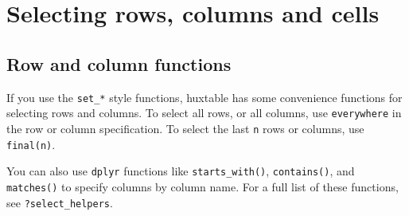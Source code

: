\documentclass[]{article}
\newenvironment{Shaded}{\begin{snugshade}}{\end{snugshade}}
\newcommand{\KeywordTok}[1]{\textcolor[rgb]{0.13,0.29,0.53}{\textbf{#1}}}
\newcommand{\NormalTok}[1]{#1}
\newcommand{\OperatorTok}[1]{\textcolor[rgb]{0.81,0.36,0.00}{\textbf{#1}}}
\newcommand{\StringTok}[1]{\textcolor[rgb]{0.31,0.60,0.02}{#1}}
\begin{document}
\hypertarget{selecting-rows-columns-and-cells}{%
\section{Selecting rows, columns and
cells}\label{selecting-rows-columns-and-cells}}

\hypertarget{row-and-column-functions}{%
\subsection{Row and column functions}\label{row-and-column-functions}}

If you use the \texttt{set\_*} style functions, huxtable has some
convenience functions for selecting rows and columns. To select all
rows, or all columns, use \texttt{everywhere} in the row or column
specification. To select the last \texttt{n} rows or columns, use
\texttt{final(n)}.

You can also use \texttt{dplyr} functions like \texttt{starts\_with()},
\texttt{contains()}, and \texttt{matches()} to specify columns by column
name. For a full list of these functions, see \texttt{?select\_helpers}.

\begin{Shaded}
\end{Shaded}

 
  \providecommand{\huxb}[2]{\arrayrulecolor[RGB]{#1}\global\arrayrulewidth=#2pt}
  \providecommand{\huxvb}[2]{\color[RGB]{#1}\vrule width #2pt}
  \providecommand{\huxtpad}[1]{\rule{0pt}{\baselineskip+#1}}
  \providecommand{\huxbpad}[1]{\rule[-#1]{0pt}{#1}}
\end{document}
